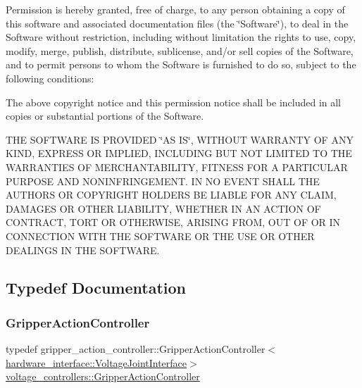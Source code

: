 Permission is hereby granted, free of charge, to any person obtaining a copy of this software and associated documentation files (the \char`\"{}\+Software\char`\"{}), to deal in the Software without restriction, including without limitation the rights to use, copy, modify, merge, publish, distribute, sublicense, and/or sell copies of the Software, and to permit persons to whom the Software is furnished to do so, subject to the following conditions\+:

The above copyright notice and this permission notice shall be included in all copies or substantial portions of the Software.

T\+HE S\+O\+F\+T\+W\+A\+RE IS P\+R\+O\+V\+I\+D\+ED \char`\"{}\+A\+S I\+S\char`\"{}, W\+I\+T\+H\+O\+UT W\+A\+R\+R\+A\+N\+TY OF A\+NY K\+I\+ND, E\+X\+P\+R\+E\+SS OR I\+M\+P\+L\+I\+ED, I\+N\+C\+L\+U\+D\+I\+NG B\+UT N\+OT L\+I\+M\+I\+T\+ED TO T\+HE W\+A\+R\+R\+A\+N\+T\+I\+ES OF M\+E\+R\+C\+H\+A\+N\+T\+A\+B\+I\+L\+I\+TY, F\+I\+T\+N\+E\+SS F\+OR A P\+A\+R\+T\+I\+C\+U\+L\+AR P\+U\+R\+P\+O\+SE A\+ND N\+O\+N\+I\+N\+F\+R\+I\+N\+G\+E\+M\+E\+NT. IN NO E\+V\+E\+NT S\+H\+A\+LL T\+HE A\+U\+T\+H\+O\+RS OR C\+O\+P\+Y\+R\+I\+G\+HT H\+O\+L\+D\+E\+RS BE L\+I\+A\+B\+LE F\+OR A\+NY C\+L\+A\+IM, D\+A\+M\+A\+G\+ES OR O\+T\+H\+ER L\+I\+A\+B\+I\+L\+I\+TY, W\+H\+E\+T\+H\+ER IN AN A\+C\+T\+I\+ON OF C\+O\+N\+T\+R\+A\+CT, T\+O\+RT OR O\+T\+H\+E\+R\+W\+I\+SE, A\+R\+I\+S\+I\+NG F\+R\+OM, O\+UT OF OR IN C\+O\+N\+N\+E\+C\+T\+I\+ON W\+I\+TH T\+HE S\+O\+F\+T\+W\+A\+RE OR T\+HE U\+SE OR O\+T\+H\+ER D\+E\+A\+L\+I\+N\+GS IN T\+HE S\+O\+F\+T\+W\+A\+RE. 

\subsection{Typedef Documentation}
\mbox{\label{namespacevoltage__controllers_a56f9a4de5492f0b87d819d8db50835fd}} 
\subsubsection{\texorpdfstring{Gripper\+Action\+Controller}{GripperActionController}}
{\footnotesize\ttfamily typedef gripper\+\_\+action\+\_\+controller\+::\+Gripper\+Action\+Controller$<$\hyperlink{classhardware__interface_1_1_voltage_joint_interface}{hardware\+\_\+interface\+::\+Voltage\+Joint\+Interface}$>$ \hyperlink{namespacevoltage__controllers_a56f9a4de5492f0b87d819d8db50835fd}{voltage\+\_\+controllers\+::\+Gripper\+Action\+Controller}}



